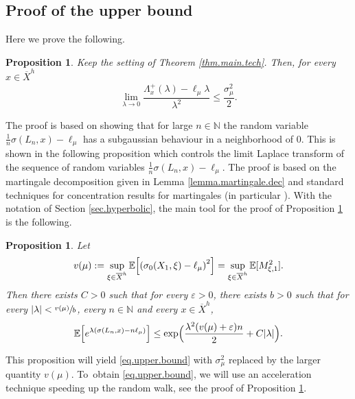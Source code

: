 \documentclass[10pt]{amsart}
\let\epsilon\varepsilon
\theoremstyle{plain}
\newtheorem{proposition}[theorem]{Proposition}
\theoremstyle{definition}
\newcommand\E{\mathbb{E}}
\newcommand\N{\mathbb{N}}
\begin{document}
\subsection{Proof of the upper bound} \label{subsec.upper.bound}
Here we prove the following.
\begin{proposition}\label{prop.upper.bound}
Keep the setting of Theorem \ref{thm.main.tech}. Then, for every $x \in \overline{X}^h$ \begin{equation}\label{eq.upper.bound}\lim_{\lambda \to 0} \frac{\Lambda_x^+(\lambda)-\ell_\mu \lambda }{\lambda^2} \leq \frac{\sigma^2_{\mu}}{2}.\end{equation}
\end{proposition}
The proof is based on showing that for large $n\in \N$ the random variable \hbox{$\frac{1}{n}\sigma(L_n,x)- \ell_\mu$} has a subgaussian behaviour in a neighborhood of $0$. This is shown in the following proposition which controls the limit Laplace transform of the sequence of random variables $ \frac{1}{n}\sigma(L_n,x) - \ell_\mu$. The proof is based on the martingale decomposition given in Lemma \ref{lemma.martingale.dec} and standard techniques for concentration results for martingales (in particular \cite[Th.\,2.19]{wainwright}). With the notation of Section \ref{sec.hyperbolic}, the main tool for the proof of Proposition \ref{prop.upper.bound} is the following.
\begin{proposition}\label{proposition.laplace.control}
Let \begin{equation}\label{eq.vmu}
v(\mu):=\sup_{\xi\in \overline{X}^h}{\E\Bigl[\left(\sigma_0(X_1,\xi)-\ell_\mu\right)^2 \Bigr]}=\sup_{\xi\in \overline{X}^h}{\E[M_{\xi,1}^2]}.
\end{equation}
Then there exists $C>0$ such that for every $\epsilon>0$, there exists $b>0$ such that for every $|\lambda|<\sfrac{v(\mu)}{b}$, every $n\in \N$ and every $x\in \overline{X}^h$,
\begin{equation}\label{eq.laplace.control}\E\Bigl[e^{\lambda (\sigma(L_n,x) - n \ell_\mu)}\Bigr] \leq \exp\Bigl(\frac{\lambda^2 (v(\mu)+\epsilon) n}{2}+ C |\lambda|\Bigr).\end{equation}
\end{proposition}

This proposition will yield \eqref{eq.upper.bound} with $\sigma_\mu^2$ replaced by the larger quantity $v(\mu)$. To~obtain \eqref{eq.upper.bound}, we will use an acceleration technique speeding up the random walk, see the proof of Proposition \ref{prop.upper.bound}.
\end{document}
